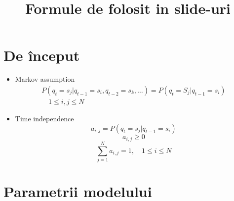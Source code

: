 \documentclass[10pt]{article}
\title{Formule de folosit in slide-uri}
\begin{document}
\maketitle

\section{De început}
\label{sec:start}


\begin{itemize}
\item Markov assumption
  \begin{equation}
    \label{eq:markovassump}
    \begin{split}
      P(q_t = s_j \vert q_{t-1}=s_i, q_{t-2}=s_k, \ldots ) = P(q_t =
      S_j \vert q_{t-1} = s_i) \\ \quad 1 \le i,j \le N
    \end{split}
  \end{equation}
\item Time independence
  \begin{equation}
    \label{eq:timeindep}
    a_{i,j}=P(q_t = s_j \vert q_{t-1} = s_i)
  \end{equation}
  \begin{equation}
    \label{eq:aispositive}
    a_{i,j} \ge 0
  \end{equation}
  \begin{equation}
    \label{eq:sumaij}
    \displaystyle\sum_{j=1}^{N}a_{i,j}=1, \quad 1 \le i \le N
  \end{equation}
\end{itemize}

\section{Parametrii modelului}
\label{sec:params}
\end{document}
